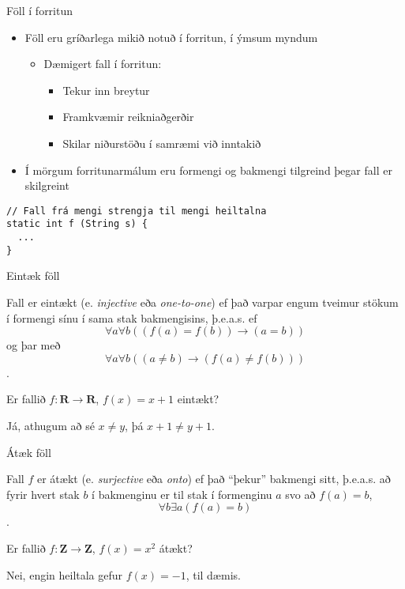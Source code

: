 \documentclass{beamer}
\begin{document}
\begin{frame}[fragile]{Föll í forritun}
\begin{itemize}
 \item Föll eru gríðarlega mikið notuð í forritun, í ýmsum myndum
 \begin{itemize}
  \item Dæmigert fall í forritun:
  \begin{itemize}
   \item Tekur inn breytur
   \item Framkvæmir reikniaðgerðir
   \item Skilar niðurstöðu í samræmi við inntakið 
  \end{itemize}
 \end{itemize}
 \item Í mörgum forritunarmálum eru formengi og bakmengi tilgreind þegar fall er skilgreint
\end{itemize}
\begin{verbatim}
// Fall frá mengi strengja til mengi heiltalna
static int f (String s) {
  ...
}
\end{verbatim}

\end{frame}

\begin{frame}{Eintæk föll}
\begin{tcolorbox}[title=Eintækt fall]
Fall er eintækt (e. \emph{injective} eða \emph{one-to-one}) ef það varpar engum tveimur stökum í formengi sínu í sama stak bakmengisins, þ.e.a.s. ef \[\forall a \forall b ((f(a) = f(b)) \to (a = b))\] og þar með \[\forall a \forall b ((a \neq b) \to (f(a) \neq f(b)))\].
\end{tcolorbox}

Er fallið $f: \mathbf{R} \to \mathbf{R}$, $f(x) = x + 1$ eintækt? \pause

Já, athugum að sé $x \neq y$, þá $x + 1 \neq y + 1$.
\end{frame}

\begin{frame}{Átæk föll}
\begin{tcolorbox}[title=Átækt fall]
Fall $f$ er átækt (e. \emph{surjective} eða \emph{onto}) ef það ``þekur'' bakmengi sitt, þ.e.a.s. að fyrir hvert stak $b$ í bakmenginu er til stak í formenginu $a$ svo að $f(a) = b$, \[\forall b \exists a (f(a) = b)\].
\end{tcolorbox}
Er fallið $f: \mathbf{Z} \to \mathbf{Z}$, $f(x) = x^2$ átækt? \pause

Nei, engin heiltala gefur $f(x) = -1$, til dæmis.
\end{frame}
\end{document}
